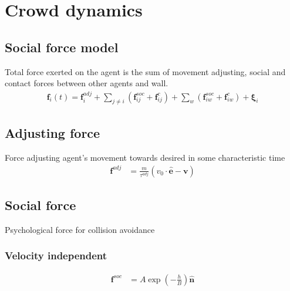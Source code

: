 \section{Crowd dynamics}
\subsection{Social force model}
Total force exerted on the agent is the sum of movement adjusting, social and contact forces between other agents and wall.
\begin{align}
\mathbf{f}_{i}(t) = \mathbf{f}_{i}^{adj} + \sum_{j\neq i}^{} \left(\mathbf{f}_{ij}^{soc} + \mathbf{f}_{ij}^{c}\right) + \sum_{w}^{} \left(\mathbf{f}_{iw}^{soc} + \mathbf{f}_{iw}^{c}\right) + \boldsymbol{\xi}_{i}
\end{align}


\subsection{Adjusting force}
Force adjusting agent's movement towards desired in some characteristic time \begin{align}
\mathbf{f}^{adj} &= \frac{m}{\tau^{adj}} (v_{0} \cdot \hat{\mathbf{e}} - \mathbf{v}) 
\end{align}


\subsection{Social force}
Psychological force for collision avoidance

\subsubsection{Velocity independent}
\begin{align}
\mathbf{f}^{soc} &= A \exp\left(-\frac{h}{B}\right) \hat{\mathbf{n}}
\end{align}


